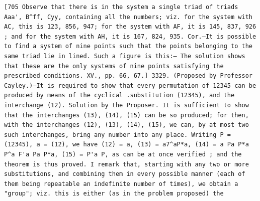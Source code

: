 \documentclass[11pt,a4paper]{book}
\begin{document}
\newpage
\setcounter{page}{574}
\begin{verbatim}
[705 Observe that there is in the system a single triad of triads Aaa', B^ff, Cyy, containing all the numbers; viz. for the system with AC, this is 123, 856, 947; for the system with AF, it is 145, 837, 926 ; and for the system with AH, it is 167, 824, 935. Cor.—It is possible to find a system of nine points such that the points belonging to the same triad lie in lined. Such a figure is this:— The solution shows that these are the only systems of nine points satisfying the prescribed conditions. XV., pp. 66, 67.] 3329. (Proposed by Professor Cayley.)—It is required to show that every permutation of 12345 can be produced by means of the cyclical .substitution (12345), and the interchange (12). Solution by the Proposer. It is sufficient to show that the interchanges (13), (14), (15) can be so produced; for then, with the interchanges (12), (13), (14), (15), we can, by at most two such interchanges, bring any number into any place. Writing P = (12345), a = (12), we have (12) = a, (13) = a7^aP*a, (14) = a Pa P*a P^a F'a Pa P*a, (15) = P'a P, as can be at once verified ; and the theorem is thus proved. I remark that, starting with any two or more substitutions, and combining them in every possible manner (each of them being repeatable an indefinite number of times), we obtain a "group"; viz. this is either (as in the problem proposed) the 
\end{verbatim}
\end{document}
